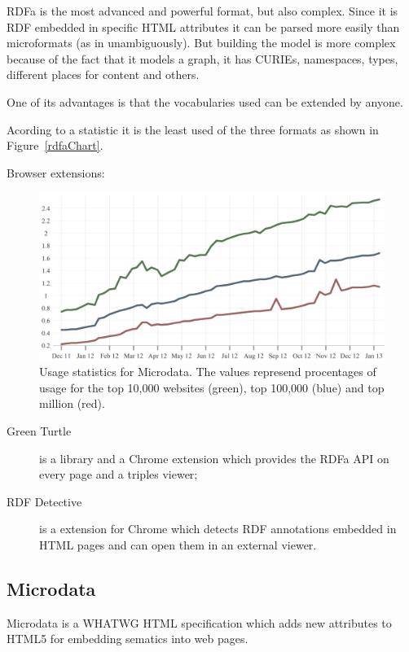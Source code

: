 \documentclass[12pt]{article}
\begin{document}
RDFa is the most advanced and powerful format, but also complex. Since it is RDF
embedded in specific HTML attributes it can be parsed more easily than
microformats (as in unambiguously). But building the model is more complex
because of the fact that it models a graph, it has CURIEs, namespaces, types,
different places for content and others.

One of its advantages is that the vocabularies used can be extended by anyone.

Acording to a statistic\cite{rdfaStat} it is the least used of the three formats
as shown in Figure~\ref{rdfaChart}. 

Browser extensions:

\begin{figure}[b!]
    \centering
    \includegraphics[width=13cm]{md-chart}
    \caption{Usage statistics for Microdata.\cite{mdStat} The values represend
    procentages of usage for the top 10,000 websites (green), top 100,000 (blue)
    and top million (red).}
    \label{mdChart}
\end{figure}


\begin{description}
    \item[Green Turtle] is a library and a Chrome extension which provides the
    RDFa API on every page and a triples viewer;\cite{greenTurtle}
    \item[RDF Detective] is a extension for Chrome which detects RDF annotations
    embedded in HTML pages and can open them in an external
    viewer.\cite{rdfDetective}
\end{description}

\subsection{Microdata}

Microdata is a WHATWG HTML specification which adds new attributes to HTML5 for
embedding sematics into web pages.\cite{mdWiki}
\end{document}
